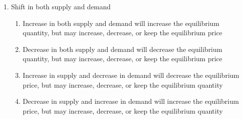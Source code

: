 \documentclass[12pt]{article}
\begin{document}
\begin{enumerate}
\begin{enumerate}
          \item Shift in both supply and demand

            \begin{enumerate}

              \item Increase in both supply and demand will increase the equilibrium quantity, but may increase, decrease, or keep the equilibrium price

              \item Decrease in both supply and demand will decrease the equilibrium quantity, but may increase, decrease, or keep the equilibrium price

              \item Increase in supply and decrease in demand will decrease the equilibrium price, but may increase, decrease, or keep the equilibrium quantity

              \item Decrease in supply and increase in demand will increase the equilibrium price, but may increase, decrease, or keep the equilibrium quantity

            \end{enumerate}

        \end{enumerate}

    \end{enumerate}
\end{document}
